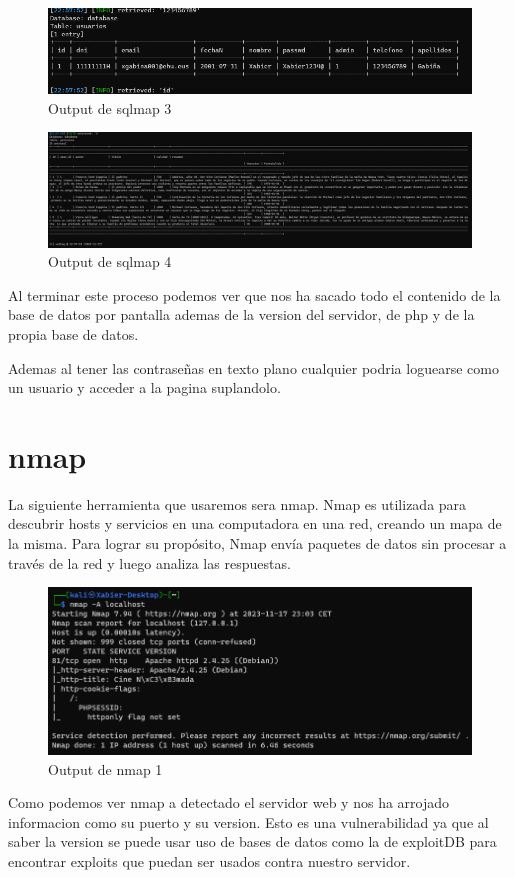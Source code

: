 \documentclass{report}
\begin{document}
            \begin{figure}[H]
                \centering
                \includegraphics[width=\textwidth]{./img/audit1/sqlmap3.png}
                \caption{Output de sqlmap 3}
            \end{figure}
            \begin{figure}[H]
                \centering
                \includegraphics[width=\textwidth]{./img/audit1/sqlmap4.png}
                \caption{Output de sqlmap 4}
            \end{figure}
            Al terminar este proceso podemos ver que nos ha sacado todo el contenido de la base de datos por pantalla ademas de la version del servidor, de php y de la propia base de datos.

            Ademas al tener las contraseñas en texto plano cualquier podria loguearse como un usuario y acceder a la pagina suplandolo.
        \clearpage
        \section{nmap}
            La siguiente herramienta que usaremos sera nmap. Nmap es utilizada para descubrir hosts y servicios en una computadora en una red, creando un mapa de la misma. Para lograr su propósito, Nmap envía paquetes de datos sin procesar a través de la red y luego analiza las respuestas.
            \begin{figure}[H]
                \centering
                \includegraphics[width=\textwidth]{./img/audit1/nmap1.png}
                \caption{Output de nmap 1}
            \end{figure}
            Como podemos ver nmap a detectado el servidor web y nos ha arrojado informacion como su puerto y su version.
            Esto es una vulnerabilidad ya que al saber la version se puede usar uso de bases de datos como la de exploitDB para encontrar exploits que puedan ser usados contra nuestro servidor.
        \clearpage
\end{document}
